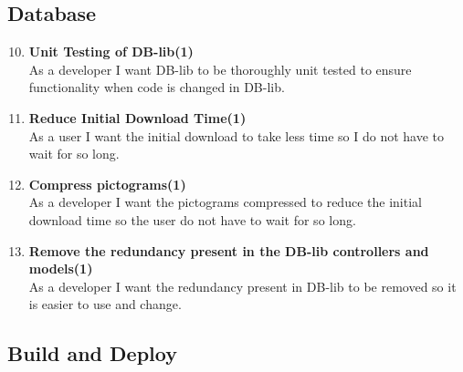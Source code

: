 \subsection{Database}

\begin{enumerate}
	\setcounter{enumi}{9} %
	\item \textbf{Unit Testing of DB-lib(1)}\\
	As a developer I want DB-lib to be thoroughly unit tested to ensure functionality when code is changed in DB-lib.
	
	\item \textbf{Reduce Initial Download Time(1)}\\
	As a user I want the initial download to take less time so I do not have to wait for so long. 	
	
	\item \textbf{Compress pictograms(1)}\\
	As a developer I want the pictograms compressed to reduce the initial download time so the user do not have to wait for so long. 
	
	\item \textbf{Remove the redundancy present in the DB-lib controllers and models(1)}\\
	As a developer I want the redundancy present in DB-lib to be removed so it is easier to use and change.
\end{enumerate}

\subsection{Build and Deploy}

